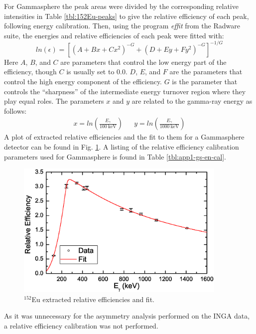 For Gammasphere the peak areas were divided by the corresponding relative intensities in Table \ref{tbl:152Eu-peaks} to give the relative efficiency of each peak, following energy calibration. Then, using the program \emph{effit} from the Radware suite, the energies and relative efficiencies of each peak were fitted with:
\begin{equation}
\label{eqn:chp3-eff_cal} 
ln(\epsilon) = [(A+Bx+Cx^2)^{-G} + (D+Ey+Fy^2)^{-G}]^{-1/G}
\end{equation}
Here $A$, $B$, and $C$ are parameters that control the low energy part of the efficiency, though $C$ is usually set to $0.0$. $D$, $E$, and $F$ are the parameters that control the high energy component of the efficiency. $G$ is the parameter that controls the ``sharpness'' of the intermediate energy turnover region where they play equal roles. The parameters $x$ and $y$ are related to the gamma-ray energy as follows:
\begin{align*}
\label{eqn:chp3-eff_x_and_y}
x=ln(\frac{E_{\gamma{}}}{100~\textrm{keV}}) && y=ln(\frac{E_{\gamma{}}}{1000~\textrm{keV}})
\end{align*}
A plot of extracted relative efficiencies and the fit to them for a Gammasphere detector can be found in Fig. \ref{fig:chp3-gs-eff-plot}. A listing of the relative efficiency calibration parameters used for Gammasphere is found in Table \ref{tbl:app1-gs-en-cal}.

\begin{figure}[h!]
	\centerline{\includegraphics[width=0.9\textwidth]{./img/c3/gs_eff_plot.eps}}
	\caption{$^{152}$Eu extracted relative efficiencies and fit.\label{fig:chp3-gs-eff-plot}}
\end{figure}

As it was unnecessary for the asymmetry analysis performed on the INGA data, a relative efficiency calibration was not performed. %

